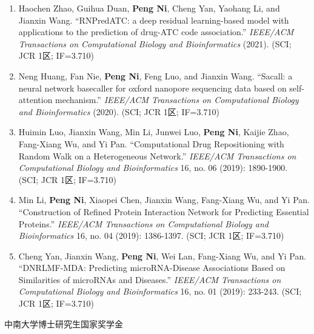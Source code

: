 \documentclass[zh]{resume}
\begin{document}
\begin{itemize}
\begin{enumerate}
    \item Haochen Zhao, Guihua Duan, \textbf{Peng Ni}, Cheng Yan, Yaohang Li, and Jianxin Wang. \enquote{RNPredATC: a deep residual learning-based model with applications to the prediction of drug-ATC code association.} {\it IEEE/ACM Transactions on Computational Biology and Bioinformatics} (2021). (SCI; JCR 1区; IF=3.710)
    \item Neng Huang, Fan Nie, \textbf{Peng Ni}, Feng Luo, and Jianxin Wang. \enquote{Sacall: a neural network basecaller for oxford nanopore sequencing data based on self-attention mechanism.} {\it IEEE/ACM Transactions on Computational Biology and Bioinformatics} (2020). (SCI; JCR 1区; IF=3.710)
    \item Huimin Luo, Jianxin Wang, Min Li, Junwei Luo, \textbf{Peng Ni}, Kaijie Zhao, Fang-Xiang Wu, and Yi Pan. \enquote{Computational Drug Repositioning with Random Walk on a Heterogeneous Network.} {\it IEEE/ACM Transactions on Computational Biology and Bioinformatics} 16, no. 06 (2019): 1890-1900. (SCI; JCR 1区; IF=3.710)
    \item Min Li, \textbf{Peng Ni}, Xiaopei Chen, Jianxin Wang, Fang-Xiang Wu, and Yi Pan. \enquote{Construction of Refined Protein Interaction Network for Predicting Essential Proteins.} {\it IEEE/ACM Transactions on Computational Biology and Bioinformatics} 16, no. 04 (2019): 1386-1397. (SCI; JCR 1区; IF=3.710)
    \item Cheng Yan, Jianxin Wang, \textbf{Peng Ni}, Wei Lan, Fang-Xiang Wu, and Yi Pan. \enquote{DNRLMF-MDA: Predicting microRNA-Disease Associations Based on Similarities of microRNAs and Diseases.} {\it IEEE/ACM Transactions on Computational Biology and Bioinformatics} 16, no. 01 (2019): 233-243. (SCI; JCR 1区; IF=3.710)
  \end{enumerate}
\end{itemize}

\begin{entries}
    {中南大学博士研究生国家奖学金}
\end{entries}


\end{document}
